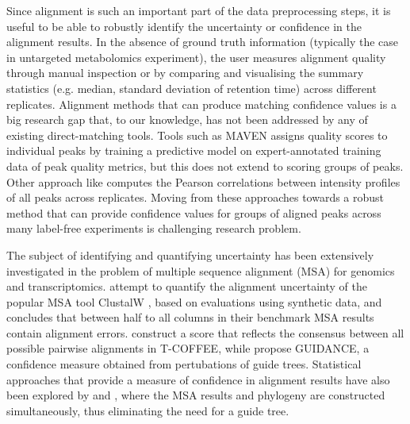 Since alignment is such an important part of the data preprocessing steps, it is useful to be able to robustly identify the uncertainty or confidence in the alignment results. In the absence of ground truth information (typically the case in untargeted metabolomics experiment), the user measures alignment quality through manual inspection or by comparing and visualising the summary statistics (e.g. median, standard deviation of retention time) across different replicates. Alignment methods that can produce matching confidence values is a big research gap that, to our knowledge, has not been addressed by any of existing direct-matching tools. Tools such as MAVEN \cite{Melamud2010} assigns quality scores to individual peaks by training a predictive model on expert-annotated training data of peak quality metrics, but this does not extend to scoring groups of peaks. Other approach like \cite{Brodsky2010} computes the Pearson correlations between intensity profiles of all peaks across replicates. Moving from these approaches towards a robust method that can provide confidence values for groups of aligned peaks across many label-free experiments is challenging research problem.

The subject of identifying and quantifying uncertainty has been extensively investigated in the problem of multiple sequence alignment (MSA) for genomics and transcriptomics. \cite{Landan2009} attempt to quantify the alignment uncertainty of the popular MSA tool ClustalW \cite{Thompson1994}, based on evaluations using synthetic data, and concludes that between half to all columns in their benchmark MSA results contain alignment errors. \cite{Notredame2000} construct a score that reflects the consensus between all possible pairwise alignments in T-COFFEE, while \cite{Penn2010} propose GUIDANCE, a confidence measure obtained from pertubations of guide trees. Statistical approaches that provide a measure of confidence in alignment results have also been explored by \cite{Redelings2005} and \cite{Bradley2009}, where the MSA results and phylogeny are constructed simultaneously, thus eliminating the need for a guide tree. 

